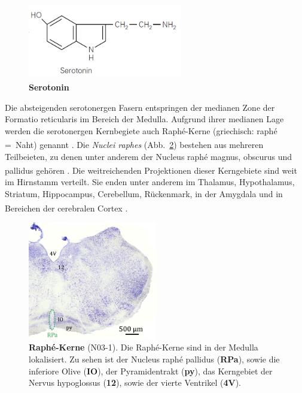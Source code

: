 \documentclass[12pt,a4paper,pdftex]{article}
\begin{document}
\begin{figure}[H]
    \centering
    \includegraphics[width=0.6\textwidth]{pictures/Bilder_monoamine_systeme/serotonin.PNG}
    \caption{\textbf{Serotonin} \textsuperscript{\cite[13]{kandel2013principles}}}
    \label{fig:serotonin}
\end{figure}{}

Die absteigenden serotonergen Fasern entspringen der medianen Zone der Formatio reticularis im Bereich der Medulla. Aufgrund ihrer medianen Lage werden die serotonergen Kernbegiete auch Raphé-Kerne (griechisch: raphé =~Naht) genannt \textsuperscript{\cite[6]{trepel2011neuroanatomie}}. Die \textit{Nuclei raphes} (Abb.~\ref{fig:raphe_nuclei}) bestehen aus mehreren Teilbeieten, zu denen unter anderem der Nucleus raphé magnus, obscurus und pallidus gehören \textsuperscript{\cite[15]{paxinos2014rat}}. Die weitreichenden Projektionen dieser Kerngebiete sind weit im Hirnstamm verteilt. Sie enden unter anderem im Thalamus, Hypothalamus, Striatum, Hippocampus, Cerebellum, Rückenmark, in der Amygdala und in Bereichen der cerebralen Cortex \textsuperscript{\cite[9]{crossman2014neuroanatomy}}. 

\begin{figure}[H]
    \centering
    \includegraphics[width=0.5\textwidth]{pictures/Bilder_monoamine_systeme/raphe_nuclei.png}
    \caption[Raphé-Kerne]{\textbf{Raphé-Kerne} (N03-1). Die Raphé-Kerne sind in der Medulla lokalisiert. Zu sehen ist der Nucleus raphé pallidus (\textbf{RPa}), sowie die inferiore Olive (\textbf{IO}), der Pyramidentrakt (\textbf{py}), das Kerngebiet der Nervus hypoglossus (\textbf{12}), sowie der vierte Ventrikel (\textbf{4V}).}
    \label{fig:raphe_nuclei}
\end{figure}
\end{document}
